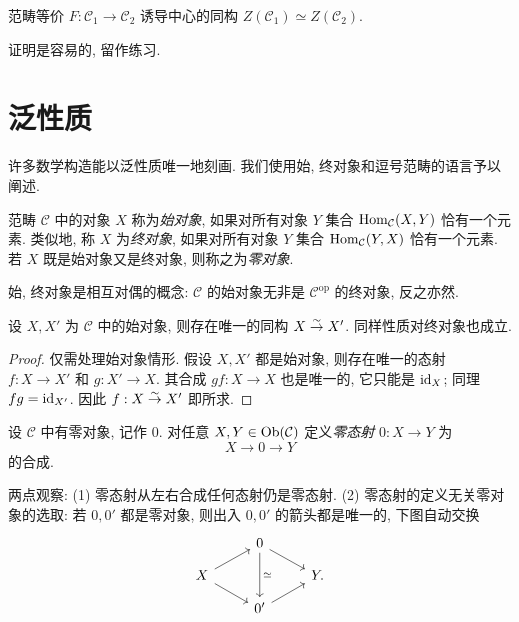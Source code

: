 \begin{proposition}
	范畴等价 $F: \mathcal{C}_1 \to \mathcal{C}_2$ 诱导中心的同构 $Z(\mathcal{C}_1) \simeq Z(\mathcal{C}_2)$.
\end{proposition}
证明是容易的, 留作练习.

\section{泛性质}\label{sec:cat-universals}
许多数学构造能以泛性质唯一地刻画. 我们使用始, 终对象和逗号范畴的语言予以阐述.

\begin{definition}\label{def:universal-objects}
	范畴 $\mathcal{C}$ 中的对象 $X$ 称为\emph{始对象}, 如果对所有对象 $Y$ 集合 $\operatorname{Hom}_{\mathcal{C}}(X, Y)$ 恰有一个元素. 类似地, 称 $X$ 为\emph{终对象}, 如果对所有对象 $Y$ 集合 $\operatorname{Hom}_{\mathcal{C}}(Y, X)$ 恰有一个元素. 若 $X$ 既是始对象又是终对象, 则称之为\emph{零对象}.
\end{definition}

始, 终对象是相互对偶的概念: $\mathcal{C}$ 的始对象无非是 $\mathcal{C}^\text{op}$ 的终对象, 反之亦然.

\begin{proposition}\label{prop:initial-obj-uniqueness}
	设 $X, X'$ 为 $\mathcal{C}$ 中的始对象, 则存在唯一的同构 $X \stackrel{\sim}{\rightarrow} X'$. 同样性质对终对象也成立.
\end{proposition}
\begin{proof}
	仅需处理始对象情形. 假设 $X, X'$ 都是始对象, 则存在唯一的态射 $f: X \to X'$ 和 $g: X' \to X$. 其合成 $gf: X \to X$ 也是唯一的, 它只能是 $\mathrm{id}_X$; 同理 $fg = \mathrm{id}_{X'}$. 因此 $f: X \stackrel{\sim}{\rightarrow} X'$ 即所求.
\end{proof}

\begin{definition}\label{def:zero-morphism}
	设 $\mathcal{C}$ 中有零对象, 记作 $0$. 对任意 $X, Y \in \operatorname{Ob}(\mathcal{C})$ 定义\emph{零态射} $0: X \to Y$ 为
	\[ X \to 0 \to Y \]
	的合成.
\end{definition}

两点观察: (1) 零态射从左右合成任何态射仍是零态射. (2) 零态射的定义无关零对象的选取: 若 $0, 0'$ 都是零对象, 则出入 $0, 0'$ 的箭头都是唯一的, 下图自动交换
\[ \begin{tikzcd}[row sep=small]
	{} & 0 \arrow[rd] \arrow[dd, "\simeq"] & {} \\
	X \arrow[ru] \arrow[rd] & & Y . \\
	& 0' \arrow[ru] &
\end{tikzcd} \]

